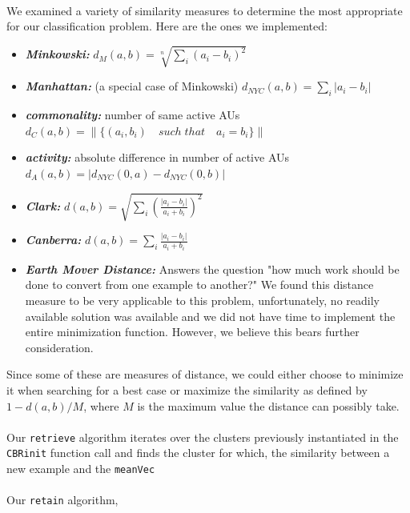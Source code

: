 \documentclass[a4paper,12pt,oneside,final]{report}
\begin{document}
\paragraph{}
We examined a variety of similarity measures to determine the most appropriate for our classification problem.  Here are the ones we implemented:
\begin{itemize}
\item {\bf\textit{Minkowski:}} $d_M(a, b) = \sqrt[n]{\sum_i(a_i -b_i)^2}$
\item {\bf\textit{Manhattan:}} (a special case of Minkowski) $d_{NYC}(a, b) = \sum_i|a_i -b_i|$
\item {\bf\textit{commonality:}} number of same active AUs $d_C(a, b) = \|\{(a_i, b_i) \quad such\; that \quad a_i = b_i\}\|$
\item {\bf\textit{activity:}} absolute difference in number of active AUs $d_A(a,b) = |d_{NYC}(0, a) - d_{NYC}(0, b)|$
\item {\bf\textit{Clark:}} $d(a, b) = \sqrt{\sum_i \left( \frac{|a_i - b_i|}{a_i + b_i} \right)^2}$
\item {\bf\textit{Canberra:}} $d(a, b) = \sum_i \frac{|a_i - b_i|}{a_i + b_i}$
\item {\bf\textit{Earth Mover Distance:}} Answers the question "how much work should be done to convert from one example to another?"  We found this distance measure to be very applicable to this problem, unfortunately, no readily available solution was available and we did not have time to implement the entire minimization function.  However, we believe this bears further consideration.
\end{itemize}
Since some of these are measures of distance, we could either choose to minimize it when searching for a best case or maximize the similarity as defined by $1 - {d(a,b)}/M$, where $M$ is the maximum value the distance can possibly take.

\paragraph{}
Our \verb+retrieve+ algorithm iterates over the clusters previously instantiated in the \verb+CBRinit+ function call and finds the cluster for which, the similarity between a new example and the \verb+meanVec+  
\paragraph{}
Our \verb+retain+ algorithm, 
\end{document}
